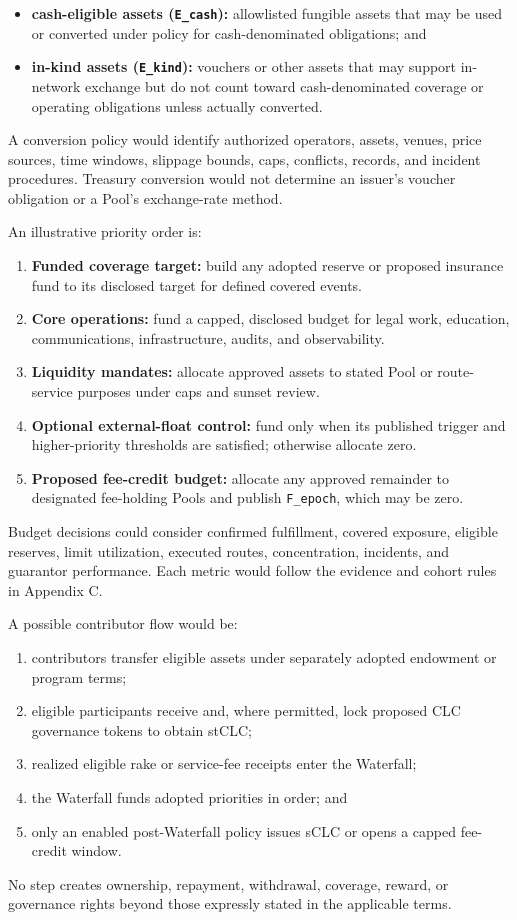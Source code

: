 \documentclass[11pt]{article}
\begin{document}
\begin{itemize}[leftmargin=*]
\item \textbf{cash-eligible assets (\texttt{E\_cash}):} allowlisted fungible assets that may be used or converted under policy for cash-denominated obligations; and
\item \textbf{in-kind assets (\texttt{E\_kind}):} vouchers or other assets that may support in-network exchange but do not count toward cash-denominated coverage or operating obligations unless actually converted.
\end{itemize}
A conversion policy would identify authorized operators, assets, venues, price sources, time windows, slippage bounds, caps, conflicts, records, and incident procedures. Treasury conversion would not determine an issuer's voucher obligation or a Pool's exchange-rate method.

An illustrative priority order is:

\begin{enumerate}[leftmargin=*]
\item \textbf{Funded coverage target:} build any adopted reserve or proposed insurance fund to its disclosed target for defined covered events.
\item \textbf{Core operations:} fund a capped, disclosed budget for legal work, education, communications, infrastructure, audits, and observability.
\item \textbf{Liquidity mandates:} allocate approved assets to stated Pool or route-service purposes under caps and sunset review.
\item \textbf{Optional external-float control:} fund only when its published trigger and higher-priority thresholds are satisfied; otherwise allocate zero.
\item \textbf{Proposed fee-credit budget:} allocate any approved remainder to designated fee-holding Pools and publish \texttt{F\_epoch}, which may be zero.
\end{enumerate}
Budget decisions could consider confirmed fulfillment, covered exposure, eligible reserves, limit utilization, executed routes, concentration, incidents, and guarantor performance. Each metric would follow the evidence and cohort rules in Appendix C.

A possible contributor flow would be:

\begin{enumerate}[leftmargin=*]
\item contributors transfer eligible assets under separately adopted endowment or program terms;
\item eligible participants receive and, where permitted, lock proposed CLC governance tokens to obtain stCLC;
\item realized eligible rake or service-fee receipts enter the Waterfall;
\item the Waterfall funds adopted priorities in order; and
\item only an enabled post-Waterfall policy issues sCLC or opens a capped fee-credit window.
\end{enumerate}
No step creates ownership, repayment, withdrawal, coverage, reward, or governance rights beyond those expressly stated in the applicable terms.
\end{document}
